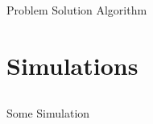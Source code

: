 \documentclass[t]{beamer}
\begin{document}
\subsection[Problem Solution Algorithm]{}
\begin{frame}[label=sl3]{Problem Solution Algorithm}

\end{frame}


\section[Simulations]{Simulations}
\subsection[Some Simulation]{}
\begin{frame}[label=sl3]{Some Simulation}

\end{frame}
\end{document}
